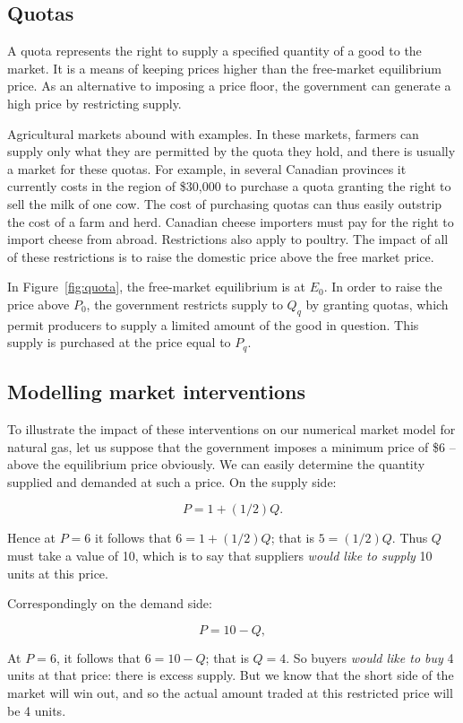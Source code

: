 \subsection*{Quotas}

A quota represents the right to supply a specified quantity of a good to the market. It is a means of keeping prices higher than the free-market equilibrium price. As an alternative to imposing a price floor, the government can generate a high price by restricting supply. 

Agricultural markets abound with examples. In these markets, farmers can supply only what they are permitted by the quota they hold, and there is usually a market for these quotas. For example, in several Canadian provinces it currently costs in the region of \$30,000 to purchase a quota granting the right to sell the milk of one cow. The cost of purchasing quotas can thus easily outstrip the cost of a farm and herd. Canadian cheese importers must pay for the right to import cheese from abroad. Restrictions also apply to poultry. The impact of all of these restrictions is to raise the domestic price above the free market price.

In Figure~\ref{fig:quota}, the free-market equilibrium is at $E_0$. In order to raise the price above $P_0$, the government restricts supply to $Q_q$ by granting quotas, which permit producers to supply a limited amount of the good in question. This supply is purchased at the price equal to $P_q$. 



\subsection*{Modelling market interventions}

To illustrate the impact of these interventions on our numerical market model for natural gas, let us suppose that the government imposes a minimum price of \$6 -- above the equilibrium price obviously. We can easily determine the quantity supplied and demanded at such a price. On the supply side:

\begin{equation*}
P=1+(1/2)Q.
\end{equation*}

Hence at $P=6$ it follows that $6=1+(1/2)Q$; that is $5=(1/2)Q$. Thus $Q$ must take a value of 10, which is to say that suppliers \textit{would like to supply} 10 units at this price.

Correspondingly on the demand side:

\begin{equation*}
P=10-Q,
\end{equation*}

At $P=6$, it follows that $6=10-Q$; that is $Q=4$. So buyers \textit{would like to buy} 4 units at that price: there is excess supply. But we know that the short side of the market will win out, and so the actual amount traded at this restricted price will be 4 units.